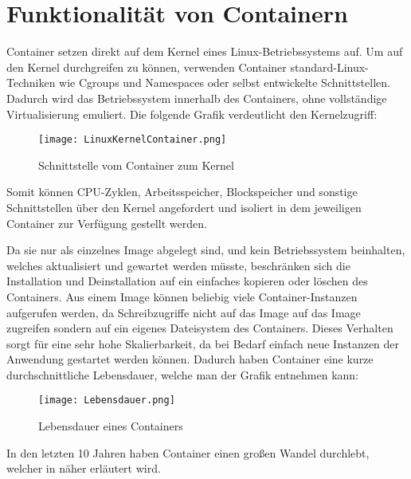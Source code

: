 \section{Funktionalität von Containern}
\label{sec:Funktionalität von Container}

Container setzen direkt auf dem Kernel eines Linux-Betriebssystems auf. Um auf den Kernel durchgreifen zu können, verwenden Container standard-Linux-Techniken wie Cgroups und Namespaces oder selbst entwickelte Schnittstellen. Dadurch wird das Betriebssystem innerhalb des Containers, ohne vollständige Virtualisierung emuliert. Die folgende Grafik verdeutlicht den Kernelzugriff:
\begin{figure}[H]
	\begin{center}
		\texttt{[image: LinuxKernelContainer.png]}
	\end{center}
	\caption[Schnittstelle vom Container zum Kernel]{Schnittstelle vom Container zum Kernel \footnotemark}
	\label{fig:HW1}
\end{figure}
Somit können CPU-Zyklen, Arbeitsspeicher, Blockspeicher und sonstige Schnittstellen über den Kernel angefordert und isoliert in dem jeweiligen Container zur Verfügung gestellt werden.\cite{DataCenter}

Da sie nur als einzelnes Image abgelegt sind, und kein Betriebssystem beinhalten, welches aktualisiert und gewartet werden müsste, beschränken sich die Installation und Deinstallation auf ein einfaches kopieren oder löschen des Containers. 
Aus einem Image können beliebig viele Container-Instanzen aufgerufen werden, da Schreibzugriffe nicht auf das Image auf das Image zugreifen sondern auf ein eigenes Dateisystem des Containers. Dieses Verhalten sorgt für eine sehr hohe Skalierbarkeit, da bei Bedarf einfach neue Instanzen der Anwendung gestartet werden können.\cite{DevInsider} Dadurch haben Container eine kurze durchschnittliche Lebensdauer, welche man der Grafik entnehmen kann:
\begin{figure}[H]
	\begin{center}
		\texttt{[image: Lebensdauer.png]}
	\end{center}
	\caption[Lebensdauer eines Containers]{Lebensdauer eines Containers \footnotemark}
	\label{fig:HW1}
\end{figure}
In den letzten 10 Jahren haben Container einen großen Wandel durchlebt, welcher in  näher erläutert wird.
\newpage